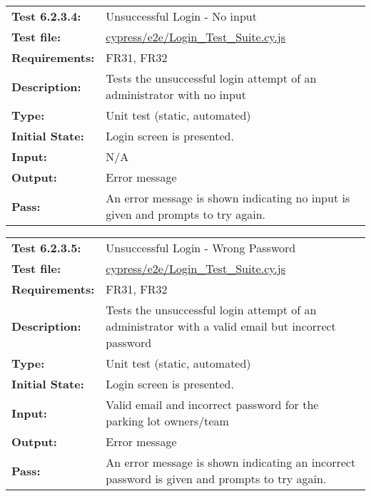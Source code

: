 \documentclass[12pt, titlepage]{article}
\begin{document}
\textcolor{red}{
\begin{center}
\begin{tabular}{|l|p{10cm}|}
    \hline
    \bf{Test} 6.2.3.4: & Unsuccessful Login - No input \\
    \bf{Test file: } &
    \href{https://github.com/parkd-app/park-d/blob/main/src/park-d-front-end/src/cypress/e2e/Login_Test_Suite.cy.js}{cypress/e2e/Login\_Test\_Suite.cy.js}\\
    \bf{Requirements}: & FR31, FR32\\
    \bf{Description}: & Tests the unsuccessful login attempt of an administrator
    with no input \\
    \bf{Type}: & Unit test (static, automated) \\
    \bf{Initial State}: & Login screen is presented. \\
    \bf{Input}: &  N/A \\
    \bf{Output}: & Error message \\
    \bf{Pass}: &  An error message is shown indicating no input is given and
    prompts to try again.\\
    \hline
\end{tabular}
\end{center}}

\textcolor{red}{
\begin{center}
\begin{tabular}{|l|p{10cm}|}
    \hline
    \bf{Test} 6.2.3.5: & Unsuccessful Login - Wrong Password \\
    \bf{Test file: } &
    \href{https://github.com/parkd-app/park-d/blob/main/src/park-d-front-end/src/cypress/e2e/Login_Test_Suite.cy.js}{cypress/e2e/Login\_Test\_Suite.cy.js}\\
    \bf{Requirements}: & FR31, FR32\\
    \bf{Description}: & Tests the unsuccessful login attempt of an administrator
    with a valid email but incorrect password \\
    \bf{Type}: & Unit test (static, automated) \\
    \bf{Initial State}: & Login screen is presented. \\
    \bf{Input}: &  Valid email and incorrect password for the parking lot
    owners/team \\
    \bf{Output}: & Error message \\
    \bf{Pass}: &  An error message is shown indicating an incorrect password is
    given and prompts to try again.\\
    \hline
\end{tabular}
\end{center}}
\end{document}
